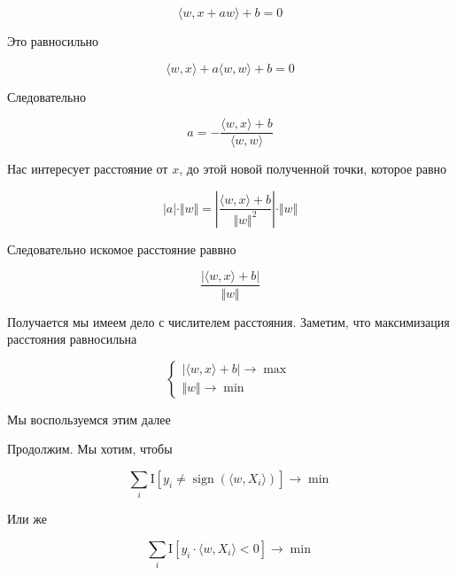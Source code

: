 \documentclass{article}
\begin{document}
    \begin{equation}
        \langle w, x + a w \rangle + b = 0 
    \end{equation}

    Это равносильно

    \begin{equation}
        \langle w, x \rangle + a \langle w, w \rangle + b = 0
    \end{equation}

    Следовательно 

    \begin{equation}
        a = - \frac{\langle w, x \rangle + b}{\langle w, w \rangle}
    \end{equation}

    Нас интересует расстояние от $x$, до этой новой полученной точки, которое равно 

    \begin{equation}
        |a| \cdot \Vert w \Vert = |\frac{\langle w, x \rangle + b}{\Vert w \Vert^{2}}| \cdot \Vert w \Vert
    \end{equation}

    Следовательно искомое расстояние раввно

    \begin{equation}
        \frac{|\langle w, x \rangle + b|}{\Vert w \Vert}
    \end{equation}

    Получается мы имеем дело с числителем расстояния. 
    Заметим, что максимизация расстояния равносильна 
    
    \[
    \begin{cases}
        |\langle w, x \rangle + b| \rightarrow \max \\ 
        \Vert w \Vert \rightarrow \min 
    \end{cases}
    \]

    Мы воспользуемся этим далее 


    \quad

    \quad


    Продолжим. Мы хотим, чтобы 

    \begin{equation}
        \sum_{i} \text{I}[y_{i} \neq \operatorname{sign}( \langle w, X_{i} \rangle)] \rightarrow \min
    \end{equation}

    Или же 

    \begin{equation}
        \sum_{i} \text{I}[y_{i} \cdot \langle w, X_{i} \rangle < 0] \rightarrow \min
    \end{equation}
\end{document}
